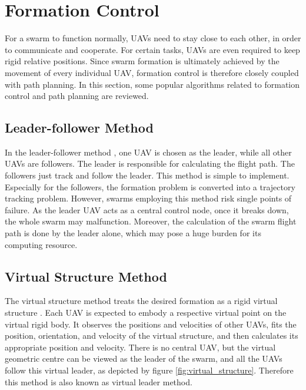 \section{Formation Control}

For a swarm to function normally, UAVs need to stay close to each other,
in order to communicate and cooperate.
For certain tasks, UAVs are even required to keep rigid relative positions.
Since swarm formation is ultimately achieved by the movement of every individual UAV,
formation control is therefore closely coupled with path planning.
In this section, some popular algorithms related to
formation control and path planning are reviewed.

\subsection{Leader-follower Method}

In the leader-follower method \parencite{Ouyang2023, Wan2023, Kamel2020},
one UAV is chosen as the leader, while all other UAVs are followers.
The leader is responsible for calculating the flight path.
The followers just track and follow the leader.
This method is simple to implement.
Especially for the followers,
the formation problem is converted into a trajectory tracking problem.
However, swarms employing this method risk single points of failure.
As the leader UAV acts as a central control node,
once it breaks down, the whole swarm may malfunction.
Moreover, the calculation of the swarm flight path is done by the leader alone,
which may pose a huge burden for its computing resource.

\subsection{Virtual Structure Method}

The virtual structure method treats the desired formation as a rigid virtual structure
\parencite{Ouyang2023, Wan2023, Kamel2020}.
Each UAV is expected to embody a respective virtual point on the virtual rigid body.
It observes the positions and velocities of other UAVs,
fits the position, orientation, and velocity of the virtual structure,
and then calculates its appropriate position and velocity.
There is no central UAV,
but the virtual geometric centre can be viewed as the leader of the swarm,
and all the UAVs follow this virtual leader,
as depicted by figure \ref{fig:virtual_structure}.
Therefore this method is also known as virtual leader method.

